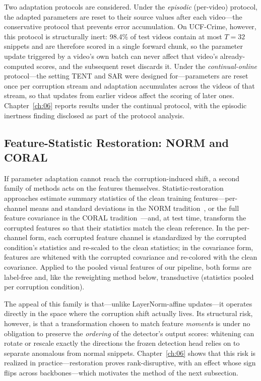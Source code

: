 Two adaptation protocols are considered. Under the \emph{episodic} (per-video) protocol, the
adapted parameters are reset to their source values after each video---the conservative protocol
that prevents error accumulation. On UCF-Crime, however, this protocol is structurally inert:
98.4\% of test videos contain at most $T=32$ snippets and are therefore scored in a single
forward chunk, so the parameter update triggered by a video's own batch can never affect that
video's already-computed scores, and the subsequent reset discards it. Under the
\emph{continual-online} protocol---the setting TENT and SAR were designed for---parameters are
reset once per corruption stream and adaptation accumulates across the videos of that stream, so
that updates from earlier videos affect the scoring of later ones. Chapter~\ref{ch:06} reports
results under the continual protocol, with the episodic inertness finding disclosed as part of
the protocol analysis.

\subsection{Feature-Statistic Restoration: NORM and CORAL}
\label{sec:meth-tta-restore}

If parameter adaptation cannot reach the corruption-induced shift, a second family of methods
acts on the features themselves. Statistic-restoration approaches estimate summary statistics of
the clean training features---per-channel means and standard deviations in the NORM
tradition~\cite{schneider2020norm}, or the full feature covariance in the CORAL
tradition~\cite{sun2016coral}---and, at test time, transform the corrupted features so that
their statistics match the clean reference. In the per-channel form, each corrupted feature
channel is standardized by the corrupted condition's statistics and re-scaled to the clean
statistics; in the covariance form, features are whitened with the corrupted covariance and
re-colored with the clean covariance. Applied to the pooled visual features of our pipeline,
both forms are label-free and, like the reweighting method below, transductive (statistics
pooled per corruption condition).

The appeal of this family is that---unlike LayerNorm-affine updates---it operates directly in
the space where the corruption shift actually lives. Its structural risk, however, is that a
transformation chosen to match feature \emph{moments} is under no obligation to preserve the
\emph{ordering} of the detector's output scores: whitening can rotate or rescale exactly the
directions the frozen detection head relies on to separate anomalous from normal snippets.
Chapter~\ref{ch:06} shows that this risk is realized in practice---restoration proves
rank-disruptive, with an effect whose sign flips across backbones---which motivates the method
of the next subsection.

